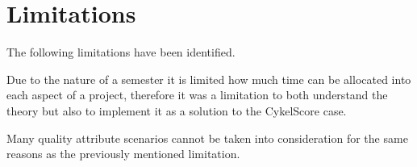 
\section{Limitations}

The following limitations have been identified.

Due to the nature of a semester it is limited how much time can be allocated into each aspect of a project, therefore it was a limitation to both understand the theory but also to implement it as a solution to the CykelScore case.

Many quality attribute scenarios cannot be taken into consideration for the same reasons as the previously mentioned limitation. 





